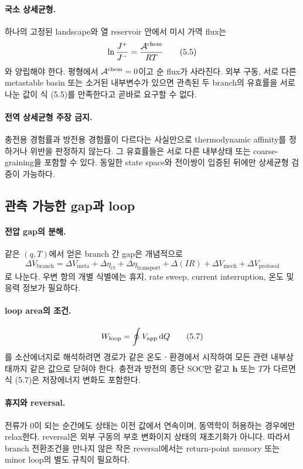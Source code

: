 \paragraph{ 국소 상세균형.}
하나의 고정된 landscape와 열 reservoir 안에서 미시 가역 flux는
\[
 \ln\frac{J^+}{J^-}=\frac{\mathcal A^{\mathrm{chem}}}{RT}
 \tag{5.5}
\]
와 양립해야 한다. 평형에서 $\mathcal A^{\mathrm{chem}}=0$이고 순 flux가
사라진다. 외부 구동, 서로 다른 metastable basin 또는 소거된
내부변수가 있으면 관측된 두 branch의 유효률을 서로 나눈 값이
식 (5.5)를 만족한다고 곧바로 요구할 수 없다.

\paragraph{ 전역 상세균형 주장 금지.}
충전용 경험률과 방전용 경험률이 다르다는 사실만으로
thermodynamic affinity를 정하거나 위반을 판정하지 않는다.
그 유효률들은 서로 다른 내부상태 또는 coarse-graining을 포함할 수
있다. 동일한 state space와 전이쌍이 입증된 뒤에만 상세균형
검증이 가능하다.

\subsection{관측 가능한 gap과 loop}

\paragraph{ 전압 gap의 분해.}
같은 $(q,T)$에서 얻은 branch 간 gap은 개념적으로
\[
 \Delta V_\mathrm{branch}
 =\Delta V_\mathrm{meta}
 +\Delta\eta_\mathrm{ct}
 +\Delta\eta_\mathrm{transport}
 +\Delta(IR)
 +\Delta V_\mathrm{mech}
 +\Delta V_\mathrm{protocol}
 \tag{5.6}
\]
로 나눈다. 우변 항의 개별 식별에는 휴지, rate sweep,
current interruption, 온도 및 응력 정보가 필요하다.

\paragraph{ loop area의 조건.}
\[
 W_{\mathrm{loop}}=\oint V_{\mathrm{app}}\,\mathrm d Q
 \tag{5.7}
\]
를 소산에너지로 해석하려면 경로가 같은 온도ㆍ환경에서 시작하여
모든 관련 내부상태까지 같은 값으로 닫혀야 한다. 충전과 방전의
종단 SOC만 같고 $\bm h$ 또는 $T$가 다르면 식 (5.7)은 저장에너지
변화도 포함한다.

\paragraph{ 휴지와 reversal.}
전류가 0이 되는 순간에도 상태는 이전 값에서 연속이며,
동역학이 허용하는 경우에만 relax한다. reversal은 외부 구동의
부호 변화이지 상태의 재초기화가 아니다. 따라서 branch 전환조건을
만나지 않은 작은 reversal에서는 return-point memory 또는
minor loop의 별도 규칙이 필요하다.

